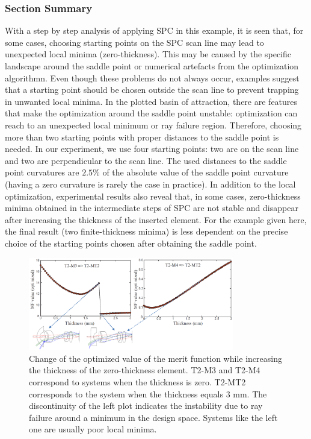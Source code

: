 \subsubsection{Section Summary}
With a step by step analysis of applying SPC in this example, it is seen that, for some cases, choosing starting points on the SPC scan line may lead to unexpected local minima (zero-thickness). This may be caused by the specific landscape around the saddle point or numerical artefacts from the optimization algorithmn. Even though these problems do not always occur, examples suggest that a starting point should be chosen outside the scan line to prevent trapping in unwanted local minima. In the plotted basin of attraction, there are features that make the optimization around the saddle point unstable: optimization can reach to an unexpected local minimum or ray failure region. Therefore, choosing more than two starting points with proper distances to the saddle point is needed. In our experiment, we use four starting points: two are on the scan line and two are perpendicular to the scan line. The used distances to the saddle point curvatures are $2.5\%$ of the absolute value of the saddle point curvature (having a zero curvature is rarely the case in practice). In addition to the local optimization, experimental results also reveal that, in some cases, zero-thickness minima obtained in the intermediate steps of SPC are not stable and disappear after increasing the thickness of the inserted element. For the example given here, the final result (two finite-thickness minima) is less dependent on the precise choice of the starting points chosen after obtaining the saddle point.  

\begin{figure}[h!]
    \centering
    \includegraphics[width=0.8\textwidth]{chapter-4/figures/thickness_increase.png}
    \caption{Change of the optimized value of the merit function while increasing the thickness of the zero-thickness element. T2-M3 and T2-M4 correspond to systems when the thickness is zero. T2-MT2 corresponds to the system when the thickness equals 3 mm. The discontinuity of the left plot indicates the instability due to ray failure around a minimum in the design space. Systems like the left one are usually poor local minima.}
    \label{fig:thickness_increase}
\end{figure}

